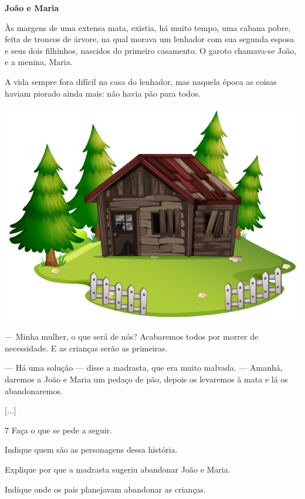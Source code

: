 \begin{myquote}
\textbf{João e Maria}

Às margens de uma extensa mata, existia, há muito tempo, uma cabana
pobre, feita de troncos de árvore, na qual morava um lenhador com sua segunda esposa e
seus dois filhinhos, nascidos do primeiro casamento. O garoto chamava-se João, e a
menina, Maria.

A vida sempre fora difícil na casa do lenhador, mas naquela época as
coisas haviam piorado ainda mais: não havia pão para todos.

\vspace{2ex}
\begin{center}
\noindent\includegraphics[width=\textwidth]{./media/image3a.png}
\end{center}

--- Minha mulher, o que será de nós? Acabaremos todos por morrer
de necessidade. E as crianças serão as primeiras.

--- Há uma solução --- disse a madrasta, que era muito
malvada. --- Amanhã, daremos a João e Maria um pedaço de pão, depois os
levaremos à mata e lá os abandonaremos.

{[}...{]}

\end{myquote}

\num{7} Faça o que se pede a seguir.

\begin{escolha}[itemsep=-5pt]
\item Indique quem são as personagens dessa história.


\item Explique por que a madrasta sugeriu abandonar João e Maria.

\pagebreak
\item Indique onde os pais planejavam abandonar as crianças.

\end{escolha}

